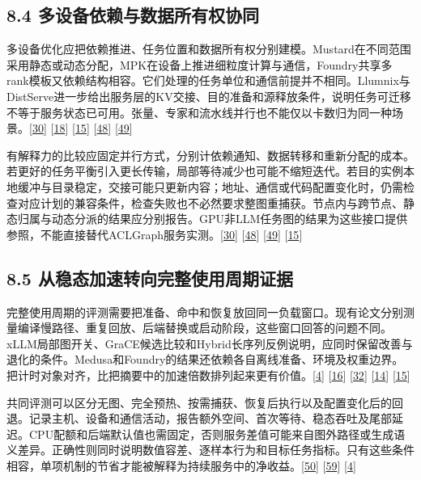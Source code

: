 \documentclass[
  11pt,
  UTF8]{ctexart}
\begin{document}
\hypertarget{section-8-4}{%
\subsection{8.4 多设备依赖与数据所有权协同}\label{section-8-4}}

多设备优化应把依赖推进、任务位置和数据所有权分别建模。Mustard在不同范围采用静态或动态分配，MPK在设备上推进细粒度计算与通信，Foundry共享多rank模板又依赖结构相容。它们处理的任务单位和通信前提并不相同。Llumnix与DistServe进一步给出服务层的KV交接、目的准备和源释放条件，说明任务可迁移不等于服务状态已可用。张量、专家和流水线并行也不能仅以卡数归为同一种场景。{[}\protect\hyperlink{ref-turimbetov2025mustard}{30}{]}
{[}\protect\hyperlink{ref-cheng2026mpk}{18}{]}
{[}\protect\hyperlink{ref-liu2026foundry}{15}{]}
{[}\protect\hyperlink{ref-sun2024llumnix}{48}{]}
{[}\protect\hyperlink{ref-zhong2024distserve}{49}{]}

有解释力的比较应固定并行方式，分别计依赖通知、数据转移和重新分配的成本。若更好的任务平衡引入更长传输，局部等待减少也可能不缩短迭代。若目的实例本地缓冲与目录稳定，交接可能只更新内容；地址、通信或代码配置变化时，仍需检查对应计划的兼容条件，检查失败也不必然要求整图重捕获。节点内与跨节点、静态归属与动态分派的结果应分别报告。GPU非LLM任务图的结果为这些接口提供参照，不能直接替代ACLGraph服务实测。{[}\protect\hyperlink{ref-turimbetov2025mustard}{30}{]}
{[}\protect\hyperlink{ref-sun2024llumnix}{48}{]}
{[}\protect\hyperlink{ref-zhong2024distserve}{49}{]}
{[}\protect\hyperlink{ref-liu2026foundry}{15}{]}

\hypertarget{section-8-5}{%
\subsection{8.5 从稳态加速转向完整使用周期证据}\label{section-8-5}}

完整使用周期的评测需要把准备、命中和恢复放回同一负载窗口。现有论文分别测量编译慢路径、重复回放、后端替换或启动阶段，这些窗口回答的问题不同。xLLM局部图开关、GraCE候选比较和Hybrid长序列反例说明，应同时保留改善与退化的条件。Medusa和Foundry的结果还依赖各自离线准备、环境及权重边界。把计时对象对齐，比把摘要中的加速倍数排列起来更有价值。{[}\protect\hyperlink{ref-liu2025xllm}{4}{]}
{[}\protect\hyperlink{ref-ghosh2026grace}{16}{]}
{[}\protect\hyperlink{ref-yadav2026hybridpreprint}{32}{]}
{[}\protect\hyperlink{ref-zeng2025medusa}{14}{]}
{[}\protect\hyperlink{ref-liu2026foundry}{15}{]}

共同评测可以区分无图、完全预热、按需捕获、恢复后执行以及配置变化后的回退。记录主机、设备和通信活动，报告额外空间、首次等待、稳态吞吐及尾部延迟。CPU配额和后端默认值也需固定，否则服务差值可能来自图外路径或生成语义差异。正确性则同时说明数值容差、逐样本行为和目标任务指标。只有这些条件相容，单项机制的节省才能被解释为持续服务中的净收益。{[}\protect\hyperlink{ref-chung2026cpu}{50}{]}
{[}\protect\hyperlink{ref-pape2026backend}{59}{]}
{[}\protect\hyperlink{ref-liu2025xllm}{4}{]}
\end{document}
